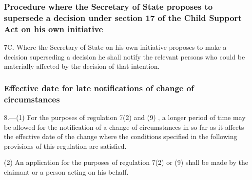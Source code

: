 \documentclass[12pt,a4paper]{article}
\begin{document}
{

\subsubsection[7C. Procedure where the Secretary of State proposes to supersede a decision under section 17 of the Child Support Act on his own initiative]{Procedure where the Secretary of State proposes to supersede a decision under section 17 of the Child Support Act on his own initiative}

7C.  Where the Secretary of State on his own initiative proposes to make a decision superseding a decision he shall notify the relevant persons who could be materially affected by the decision of that intention.

}

\subsubsection[8. Effective date for late notifications of change of circumstances]{Effective date for late notifications of change of circumstances}

8.—(1) For the purposes of regulation 7(2)
and (9)%
, a longer period of time may be allowed for the notification of a change of circumstances in so far as it affects the effective date of the change where the conditions specified in the following provisions of this regulation are satisfied.

(2) An application for the purposes of regulation 7(2) 
or (9)  %
shall be made by the claimant or a person acting on his behalf.
\end{document}
